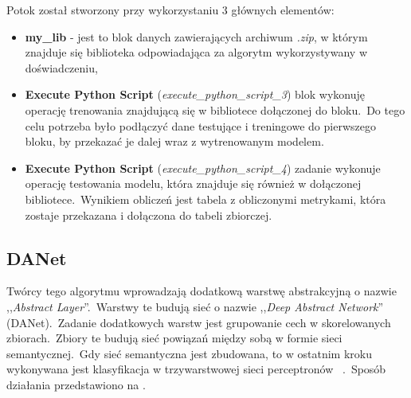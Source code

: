 Potok został stworzony przy wykorzystaniu 3 głównych elementów:
\begin{itemize}
    \item \textbf{my\_lib} - jest to blok danych zawierających archiwum \textit{.zip}, w którym znajduje się biblioteka odpowiadająca za algorytm wykorzystywany w doświadczeniu,
    \item \textbf{Execute Python Script} (\textit{execute\_python\_script\_3}) blok wykonuję operację trenowania znajdującą się w bibliotece dołączonej do bloku.\ Do tego celu potrzeba było podłączyć dane testujące i treningowe do pierwszego bloku, by przekazać je dalej wraz z wytrenowanym modelem.
    \item \textbf{Execute Python Script} (\textit{execute\_python\_script\_4}) zadanie wykonuje operację testowania modelu, która znajduje się również w dołączonej bibliotece.\ Wynikiem obliczeń jest tabela z obliczonymi metrykami, która zostaje przekazana i dołączona do tabeli zbiorczej.
\end{itemize}
\vfill
\pagebreak

\subsection{DANet}
Twórcy tego algorytmu wprowadzają dodatkową warstwę abstrakcyjną o nazwie ,,\textit{Abstract Layer}''.\ Warstwy te budują sieć o nazwie ,,\textit{Deep Abstract Network}'' (DANet).\ Zadanie dodatkowych warstw jest grupowanie cech w skorelowanych zbiorach.\ Zbiory te budują sieć powiązań między sobą w formie sieci semantycznej.\ Gdy sieć semantyczna jest zbudowana, to w ostatnim kroku wykonywana jest klasyfikacja w trzywarstwowej sieci perceptronów ~\cite{Chen2022, Danet}.\ Sposób działania przedstawiono na .


